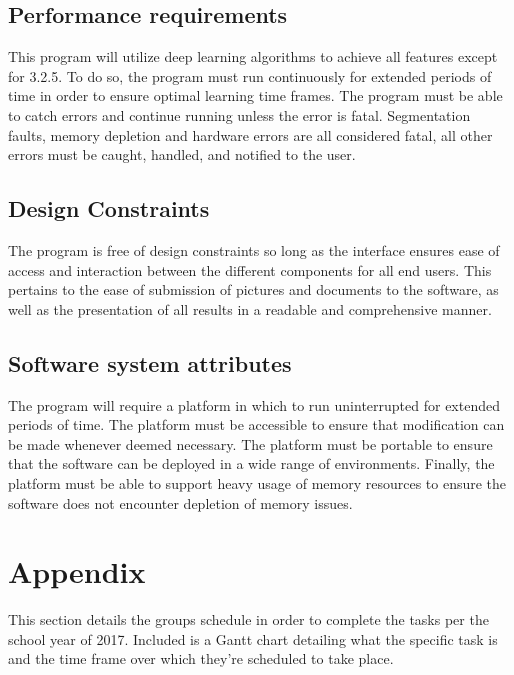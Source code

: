 \documentclass[onecolumn, draftclsnofoot,10pt, compsoc]{IEEEtran}
\begin{document}
\subsection{Performance requirements}
This program will utilize deep learning algorithms to achieve all features except for 3.2.5. To do so, the program must run continuously for extended periods of time in order to ensure optimal learning time frames. The program must be able to catch errors and continue running unless the error is fatal. Segmentation faults, memory depletion and hardware errors are all considered fatal, all other errors must be caught, handled, and notified to the user. 


\subsection{Design Constraints}
The program is free of design constraints so long as the interface ensures ease of access and interaction between the different components for all end users. This pertains to the ease of submission of pictures and documents to the software, as well as the presentation of all results in a readable and comprehensive manner. 


\subsection{Software system attributes}
The program will require a platform in which to run uninterrupted for extended periods of time. The platform must be accessible to ensure that modification can be made whenever deemed necessary. The platform must be portable to ensure that the software can be deployed in a wide range of environments.  Finally, the platform must be able to support heavy usage of memory resources to ensure the software does not encounter depletion of memory issues. 

\pagebreak

\section{Appendix}

This section details the groups schedule in order to complete the tasks per the school year of 2017. Included is a Gantt chart detailing what the specific task is and the time frame over which they're scheduled to take place.
\end{document}
